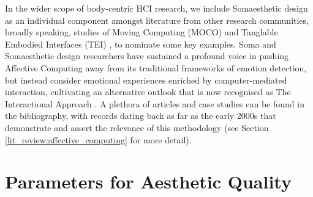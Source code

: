 In the wider scope of body-centric HCI research, we include Somaesthetic design as an individual component amongst literature from other research communities, broadly speaking, studies of Moving Computing (MOCO) \cite{zhou_dance_2021} and Tanglable Embodied Interfaces (TEI) \cite{li_meta-analysis_2022}, to nominate some key examples. Soma and Somaesthetic design researchers have sustained a profound voice in pushing Affective Computing away from its traditional frameworks of emotion detection, but instead consider emotional experiences enriched by computer-mediated interaction, cultivating an alternative outlook that is now recognised as The Interactional Approach \citep{hook_affective_2009}. A plethora of articles and case studies can be found in the bibliography, with records dating back as far as the early 2000s that demonstrate and assert the relevance of this methodology (see Section \ref{lit_review:affective_computing} for more detail).








\section{Parameters for Aesthetic Quality}
\label{cha:aestheitic_parameters}

